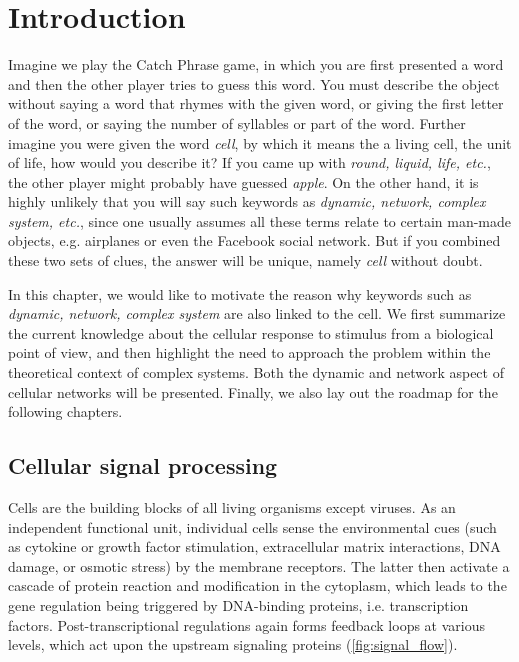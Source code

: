 \chapter{Introduction}
Imagine we play the Catch Phrase game, in which you are
first presented a word and then the other player tries 
to guess this
word. You must describe the object without saying a word that rhymes with the given word, or giving the first letter of the word, or saying the number of syllables or part of the word.
Further imagine you were given the word \emph{cell}, 
by which it means the a living cell, the unit of life,
how 
would you describe it? If you came up with \emph{round,
liquid, life, etc.}, the other player might probably have guessed 
\emph{apple}. On the other hand, it is highly unlikely that 
you will say such keywords as
\emph{dynamic, network, complex system, etc.}, since one 
usually assumes all these terms relate to certain man-made 
objects, e.g. airplanes or even the Facebook social network. 
But if you combined these two sets of clues, 
the answer will be unique, namely \emph{cell} without doubt.

In this chapter, we would like to motivate the reason 
why keywords such
as \emph{dynamic, network, complex system} are also linked
to the cell.
We first summarize the current knowledge about
the cellular response to stimulus from a biological point of
view, and then highlight the need to approach the problem
within the theoretical context of complex systems. 
Both the dynamic and 
network aspect of cellular networks will be presented. 
Finally, we also lay out the roadmap for the following 
chapters.

\section{Cellular signal processing}
Cells are the building blocks of all living organisms except viruses. As an 
independent functional unit, individual cells sense the environmental cues 
(such as cytokine or growth factor stimulation, extracellular matrix interactions, DNA damage, or osmotic stress) by the membrane receptors. The latter
then activate a cascade of protein reaction and modification in the cytoplasm,
which leads to the gene regulation being triggered by 
DNA-binding proteins, i.e. transcription factors. Post-transcriptional
regulations again forms feedback loops at various levels, which act upon the
upstream signaling proteins (\ref{fig:signal_flow}).

